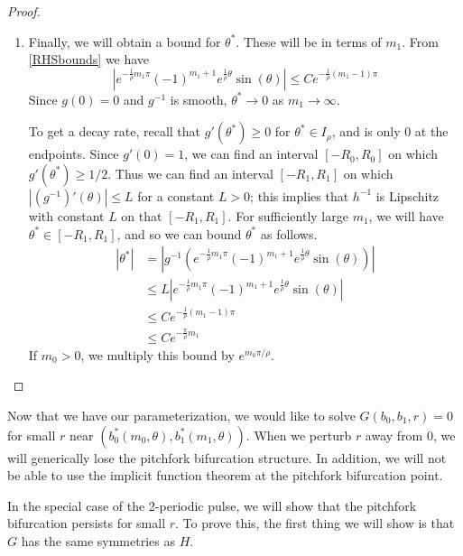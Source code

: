 \documentclass[thesis.tex]{subfiles}
\begin{document}
\begin{lemma}
\begin{proof}
\begin{enumerate}
	\item Finally, we will obtain a bound for $\theta^*$. These will be in terms of $m_1$. From \eqref{RHSbounds} we have
	\[
	|e^{ -\frac{1}{\rho} m_1 \pi } (-1)^{m_1 + 1}  e^{ \frac{1}{\rho} \theta } \sin(\theta)| \leq C e^{ -\frac{1}{\rho}(m_1 - 1) \pi }
	\]
	Since $g(0) = 0$ and $g^{-1}$ is smooth, $\theta^* \rightarrow 0$ as $m_1 \rightarrow \infty$. 

	To get a decay rate, recall that $g'(\theta^*) \geq 0$ for $\theta^* \in I_\rho$, and is only 0 at the endpoints. Since $g'(0) = 1$, we can find an interval $[-R_0,R_0]$ on which $g'(\theta^*) \geq 1/2$. Thus we can find an interval $[-R_1, R_1]$ on which $|(g^{-1})'(\theta)| \leq L$ for a constant $L > 0$; this implies that $h^{-1}$ is Lipschitz with constant $L$ on that $[-R_1, R_1]$. For sufficiently large $m_1$, we will have $\theta^* \in [-R_1, R_1]$, and so we can bound $\theta^*$ as follows.
	\begin{align*}
	|\theta^*| &= | g^{-1}(e^{ -\frac{1}{\rho} m_1 \pi } (-1)^{m_1 + 1}  e^{ \frac{1}{\rho} \theta } \sin(\theta)) | \\
	&\leq L |e^{ -\frac{1}{\rho} m_1 \pi } (-1)^{m_1 + 1}  e^{ \frac{1}{\rho} \theta } \sin(\theta)| \\
	&\leq C e^{ -\frac{1}{\rho}(m_1 - 1) \pi } \\
	&\leq C e^{ -\frac{\pi}{\rho} m_1 }
	\end{align*}
	If $m_0 > 0$, we multiply this bound by $e^{m_0 \pi/\rho}$.
\end{enumerate}
\end{proof}
\end{lemma}

Now that we have our parameterization, we would like to solve $G(b_0, b_1, r) = 0$ for small $r$ near $(b_0^*(m_0, \theta), b_1^*(m_1, \theta))$. When we perturb $r$ away from 0, we will generically lose the pitchfork bifurcation structure. In addition, we will not be able to use the implicit function theorem at the pitchfork bifurcation point.

In the special case of the 2-periodic pulse, we will show that the pitchfork bifurcation persists for small $r$. To prove this, the first thing we will show is that $G$ has the same symmetries as $H$.

\end{document}

